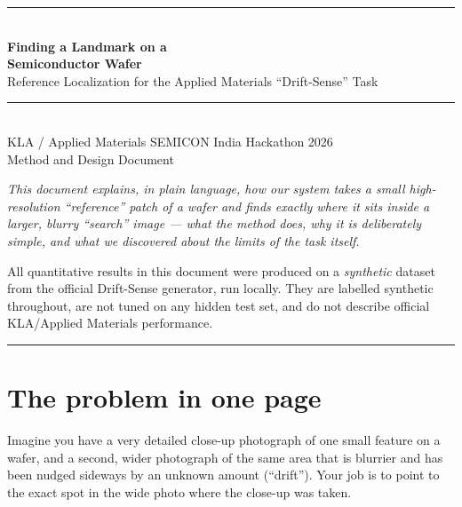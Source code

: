 \documentclass[11pt]{article}
\begin{document}
\begin{titlepage}
\centering
\vspace*{1.5cm}
{\color{klablue}\rule{\textwidth}{2pt}}\\[0.6cm]
{\Huge\bfseries\color{klablue} Finding a Landmark on a\\[0.2cm] Semiconductor Wafer}\\[0.5cm]
{\Large\color{klagrey} Reference Localization for the Applied Materials ``Drift-Sense'' Task}\\[0.8cm]
{\color{klateal}\rule{0.6\textwidth}{1pt}}\\[0.6cm]
{\large KLA / Applied Materials SEMICON India Hackathon 2026}\\[0.3cm]
{\large Method and Design Document}\\[1.2cm]

\begin{minipage}{0.85\textwidth}
\centering\itshape\color{klagrey}
This document explains, in plain language, how our system takes a small
high-resolution ``reference'' patch of a wafer and finds exactly where it
sits inside a larger, blurry ``search'' image --- what the method does, why
it is deliberately simple, and what we discovered about the limits of the
task itself.
\end{minipage}

\vfill
{\color{klagrey}\small All quantitative results in this document were produced on a
\emph{synthetic} dataset from the official Drift-Sense generator, run
locally. They are labelled synthetic throughout, are not tuned on any hidden
test set, and do not describe official KLA/Applied Materials performance.}\\[0.4cm]
{\color{klablue}\rule{\textwidth}{2pt}}
\end{titlepage}

\tableofcontents
\newpage

\section{The problem in one page}

Imagine you have a very detailed close-up photograph of one small feature on
a wafer, and a second, wider photograph of the same area that is blurrier and
has been nudged sideways by an unknown amount (``drift''). Your job is to
point to the exact spot in the wide photo where the close-up was taken.
\end{document}
